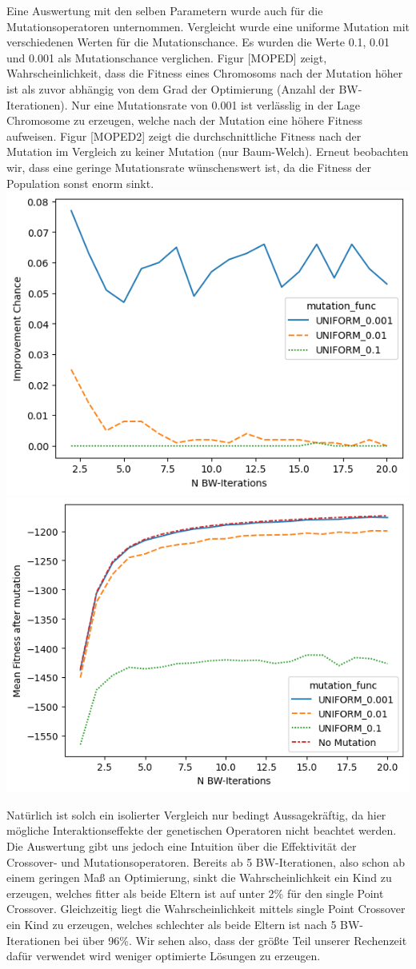 Eine Auswertung mit den selben Parametern wurde auch für die Mutationsoperatoren unternommen. Vergleicht wurde eine uniforme Mutation mit verschiedenen Werten für die Mutationschance. Es wurden die Werte 0.1, 0.01 und 0.001 als Mutationschance verglichen. Figur [MOPED] zeigt, Wahrscheinlichkeit, dass die Fitness eines Chromosoms nach der Mutation höher ist als zuvor abhängig von dem Grad der Optimierung (Anzahl der BW-Iterationen). Nur eine Mutationsrate von 0.001 ist verlässlig in der Lage Chromosome zu erzeugen, welche nach der Mutation eine höhere Fitness aufweisen. Figur [MOPED2] zeigt die durchschnittliche Fitness nach der Mutation im Vergleich zu keiner Mutation (nur Baum-Welch). Erneut beobachten wir, dass eine geringe Mutationsrate wünschenswert ist, da die Fitness der Population sonst enorm sinkt.
\includegraphics[width=0.5\linewidth]{images/charts/mutation_function_improvement_chance.png}
\includegraphics[width=0.5\linewidth]{images/charts/mean_fitness_after_mutation.png}

Natürlich ist solch ein isolierter Vergleich nur bedingt Aussagekräftig, da hier mögliche Interaktionseffekte der genetischen Operatoren nicht beachtet werden. Die Auswertung gibt uns jedoch eine Intuition über die Effektivität der Crossover- und Mutationsoperatoren. Bereits ab 5 BW-Iterationen, also schon ab einem geringen Maß an Optimierung, sinkt die Wahrscheinlichkeit ein Kind zu erzeugen, welches fitter als beide Eltern ist auf unter 2\% für den single Point Crossover. Gleichzeitig liegt die Wahrscheinlichkeit mittels single Point Crossover ein Kind zu erzeugen, welches schlechter als beide Eltern ist nach 5 BW-Iterationen bei über 96\%. Wir sehen also, dass der größte Teil unserer Rechenzeit dafür verwendet wird weniger optimierte Lösungen zu erzeugen.

